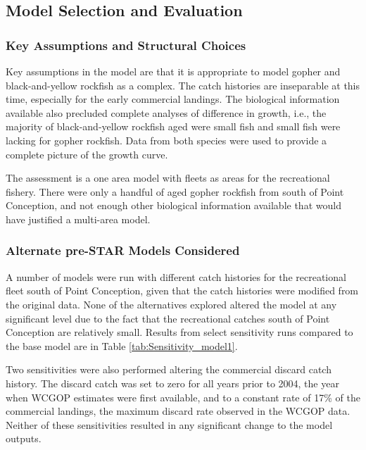 \documentclass[12pt,]{article}
\begin{document}
\subsection{Model Selection and
Evaluation}\label{model-selection-and-evaluation}

\subsubsection{Key Assumptions and Structural
Choices}\label{key-assumptions-and-structural-choices}

Key assumptions in the model are that it is appropriate to model gopher
and black-and-yellow rockfish as a complex. The catch histories are
inseparable at this time, especially for the early commercial landings.
The biological information available also precluded complete analyses of
difference in growth, i.e., the majority of black-and-yellow rockfish
aged were small fish and small fish were lacking for gopher rockfish.
Data from both species were used to provide a complete picture of the
growth curve.

The assessment is a one area model with fleets as areas for the
recreational fishery. There were only a handful of aged gopher rockfish
from south of Point Conception, and not enough other biological
information available that would have justified a multi-area model.

\subsubsection{Alternate pre-STAR Models
Considered}\label{alternate-pre-star-models-considered}

A number of models were run with different catch histories for the
recreational fleet south of Point Conception, given that the catch
histories were modified from the original data. None of the alternatives
explored altered the model at any significant level due to the fact that
the recreational catches south of Point Conception are relatively small.
Results from select sensitivity runs compared to the base model are in
Table \ref{tab:Sensitivity_model1}.

Two sensitivities were also performed altering the commercial discard
catch history. The discard catch was set to zero for all years prior to
2004, the year when WCGOP estimates were first available, and to a
constant rate of 17\% of the commercial landings, the maximum discard
rate observed in the WCGOP data. Neither of these sensitivities resulted
in any significant change to the model outputs.
\end{document}
